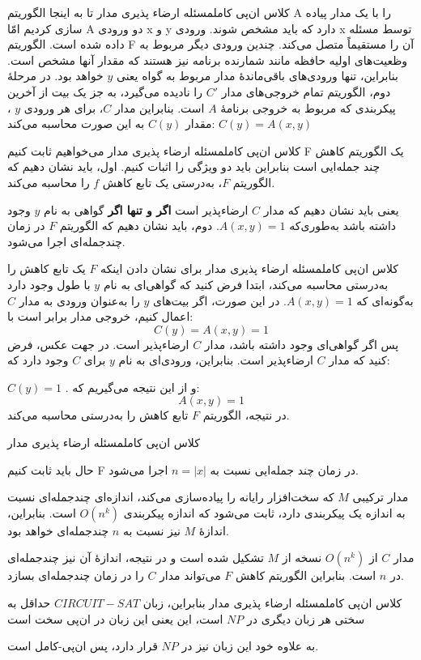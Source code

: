 \begin{itemframe-s}{کلاس ان‌پی کامل}{مسئله ارضاء پذیری مدار}
\itm
تا به اینجا الگوریتم A را با یک مدار پیاده سازی کردیم امّا A دو ورودی x و y دارد که باید مشخص شوند. ورودی x توسط مسئله داده شده است. الگوریتم F آن را مستقیماً متصل می‌کند. چندین ورودی دیگر مربوط به وظعیت‌های اولیه حافظه مانند شمارنده برنامه نیز هستند که مقدار آنها مشخص است.
\itm
بنابراین، تنها ورودی‌های باقی‌ماندهٔ مدار مربوط به گواه یعنی $y$ خواهد بود.
\itm
در مرحلهٔ دوم، الگوریتم تمام خروجی‌های مدار $C'$ را نادیده می‌گیرد، به جز یک بیت از آخرین پیکربندی که مربوط به خروجی برنامهٔ $A$ است.
\itm
بنابراین مدار $C$، برای هر ورودی $y$ ، مقدار $C(y)$ به این صورت محاسبه می‌کند:
$C(y) = A(x, y)$
\end{itemframe-s}


\begin{itemframe-s}{کلاس ان‌پی کامل}{مسئله ارضاء پذیری مدار}
\itm
می‌خواهیم ثابت کنیم F یک الگوریتم کاهش چند جمله‌ایی است بنابراین باید دو ویژگی را اثبات کنیم.
\itm
اول، باید نشان دهیم که الگوریتم $F$، به‌درستی یک تابع کاهش $f$ را محاسبه می‌کند.

یعنی باید نشان دهیم که مدار $C$ ارضاء‌پذیر است \textbf{اگر و تنها اگر} گواهی به نام $y$ وجود داشته باشد به‌طوری‌که
$A(x, y) = 1$.
\itm
دوم، باید نشان دهیم که الگوریتم $F$ در زمان چندجمله‌ای اجرا می‌شود.
\end{itemframe-s}


\begin{itemframe-s}{کلاس ان‌پی کامل}{مسئله ارضاء پذیری مدار}
\itm
برای نشان دادن اینکه $F$ یک تابع کاهش را به‌درستی محاسبه می‌کند، ابتدا فرض کنید که گواهی‌ای به نام $y$ با طول وجود دارد به‌گونه‌ای که
$A(x, y) = 1$.
در این صورت، اگر بیت‌های $y$ را به‌عنوان ورودی به مدار $C$ اعمال کنیم، خروجی مدار برابر است با:
$$
C(y) = A(x, y) = 1
$$
پس اگر گواهی‌ای وجود داشته باشد، مدار $C$ ارضاء‌پذیر است.
\itm
در جهت عکس، فرض کنید که مدار $C$ ارضاءپذیر است. بنابراین، ورودی‌ای به نام $y$ برای $C$ وجود دارد که:

$C(y)=1$ .
و از این نتیجه می‌گیریم که:
$$A(x,y)=1$$
\itm
در نتیجه، الگوریتم $F$ تابع کاهش را به‌درستی محاسبه می‌کند.
\end{itemframe-s}


\begin{itemframe-s}{کلاس ان‌پی کامل}{مسئله ارضاء پذیری مدار}

\itm
حال باید ثابت کنیم F در زمان چند جمله‌ایی نسبت به
$n = |x|$
اجرا می‌شود.

\itm
مدار ترکیبی $M$ که سخت‌افزار رایانه را پیاده‌سازی می‌کند، اندازه‌ای چندجمله‌ای نسبت به اندازه یک پیکربندی دارد، ثابت می‌شود که اندازه پیکربندی
$O(n^k)$
است. بنابراین، اندازهٔ $M$ نیز نسبت به $n$ چندجمله‌ای خواهد بود.

\itm
مدار $C$ از
$O(n^k)$
نسخه از $M$ تشکیل شده است و در نتیجه، اندازهٔ آن نیز چندجمله‌ای در $n$ است.
بنابراین الگوریتم کاهش $F$ می‌تواند مدار $C$ را در زمان چندجمله‌ای بسازد.

\end{itemframe-s}


\begin{itemframe-s}{کلاس ان‌پی کامل}{مسئله ارضاء پذیری مدار}
\itm
بنابراین، زبان $CIRCUIT-SAT$ حداقل به سختی هر زبان دیگری در $NP$ است، این یعنی این زبان در ان‌پی سخت است

\itm
به علاوه خود این زبان نیز در
$NP$
قرار دارد، پس ان‌پی‌-کامل است.

\end{itemframe-s}
